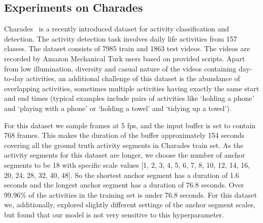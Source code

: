 \documentclass[10pt,twocolumn,letterpaper]{article}
\newcommand{\modelname}[0]{R-C3D }
\begin{document}
\begin{figure*}[!t]
\centering
{}
\caption
{Qualitative visualization of the predicted activities by \modelname (best viewed in color). Figure  and  show results for two videos each in THUMOS'14 and ActivityNet.~ shows the result for one video from Charades. Groundtruth activity segments are marked in black. Predicted activity segments are marked in green for correct predictions and in red for wrong ones. Predicted activities with IoU more than 0.5 are considered as correct. Corresponding start-end times and confidence score are shown inside brackets.}
\vspace{-0.2in}
\label{fig:qualitative}
\end{figure*}

\subsection{Experiments on Charades}
\label{exp:charades}

Charades~\cite{sigurdsson2016hollywood} is a recently introduced dataset for activity classification and detection.
The activity detection task involves daily life activities from 157 classes.
The dataset consists of 7985 train and 1863 test videos.
The videos are recorded by Amazon Mechanical Turk users based on provided scripts.
Apart from low illumination, diversity and casual nature of the videos containing day-to-day activities, an additional challenge of this dataset is the abundance of overlapping activities, sometimes multiple activities having exactly the same start and end times (typical examples include pairs of activities like `holding a phone' and `playing with a phone' or `holding a towel' and `tidying up a towel').

For this dataset we sample frames at 5 fps, and the input buffer is set to contain 768 frames.
This makes the duration of the buffer approximately 154 seconds covering all the ground truth activity segments in Charades train set.
As the activity segments for this dataset are longer, we choose the number of anchor segments  to be 18 with specific scale values [1, 2, 3, 4, 5, 6, 7, 8, 10, 12, 14, 16, 20, 24, 28, 32, 40, 48].
So the shortest anchor segment has a duration of 1.6 seconds and the longest anchor segment has a duration of 76.8 seconds. 
Over 99.96\% of the activities in the training set is under 76.8 seconds.
For this dataset we, additionally, explored slightly different settings of the anchor segment scales, but found that our model is not very sensitive to this hyperparameter. 
\end{document}
